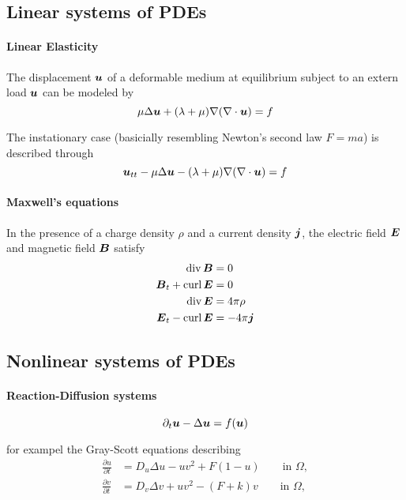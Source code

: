 \documentclass[11pt]{article}
\begin{document}
    \subsection{Linear systems of PDEs}\label{linear-systems-of-pdes}

\paragraph{Linear Elasticity}\label{linear-elasticity}

The displacement \(\boldsymbol u\) of a deformable medium at equilibrium subject
to an extern load \(\boldsymbol u\) can be modeled by \[
\mu\Delta\boldsymbol u  + (\lambda + \mu)\nabla (\nabla \cdot \boldsymbol u) = f
\]

The instationary case (basicially resembling Newton's second law
\(F = ma\)) is described through \[
\boldsymbol u_{tt} - \mu\Delta\boldsymbol u  - (\lambda + \mu)\nabla (\nabla \cdot \boldsymbol u) = f
\]

    \paragraph{Maxwell's equations}\label{maxwells-equations}

In the presence of a charge density \(\rho\) and a current density
\(\boldsymbol j\), the electric field \(\boldsymbol E\) and magnetic field \(\boldsymbol B\)
satisfy
\begin{align}
\operatorname{div} \boldsymbol B &= 0 \\
\boldsymbol B_t + \operatorname{curl} \boldsymbol E &= 0 \\
\operatorname{div} \boldsymbol E &= 4\pi\rho \\
\boldsymbol E_t - \operatorname{curl} \boldsymbol E &= - 4 \pi \boldsymbol j
\end{align}

    \subsection{Nonlinear systems of PDEs}\label{nonlinear-systems-of-pdes}

\paragraph{Reaction-Diffusion systems}\label{reaction-diffusion-systems}

\[
 \partial_t \boldsymbol u - \Delta \boldsymbol u = f(\boldsymbol u)
\]

for exampel the Gray-Scott equations describing
\begin{align}
\frac{\partial u}{\partial t} & = D_u \Delta u - u v^2 + F(1-u) \qquad \text{in } \Omega, 
\\  
\frac{\partial v}{\partial t} & = D_v \Delta v + u v^2 - (F+k)v \qquad \text{in } \Omega,     
\end{align} 
\end{document}
